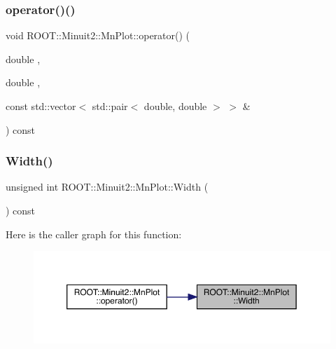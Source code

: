 \subsubsection{\texorpdfstring{operator()()}{operator()()}\hspace{0.1cm}{\footnotesize\ttfamily [4/4]}}
{\footnotesize\ttfamily void R\+O\+O\+T\+::\+Minuit2\+::\+Mn\+Plot\+::operator() (\begin{DoxyParamCaption}\item[{double}]{,  }\item[{double}]{,  }\item[{const std\+::vector$<$ std\+::pair$<$ double, double $>$ $>$ \&}]{ }\end{DoxyParamCaption}) const}

\mbox{\label{classROOT_1_1Minuit2_1_1MnPlot_ae9d97799fcd00d4aa2095884d99dc588}} 
\subsubsection{\texorpdfstring{Width()}{Width()}\hspace{0.1cm}{\footnotesize\ttfamily [1/2]}}
{\footnotesize\ttfamily unsigned int R\+O\+O\+T\+::\+Minuit2\+::\+Mn\+Plot\+::\+Width (\begin{DoxyParamCaption}{ }\end{DoxyParamCaption}) const\hspace{0.3cm}{\ttfamily [inline]}}

Here is the caller graph for this function\+:\nopagebreak
\begin{figure}[H]
\begin{center}
\leavevmode
\includegraphics[width=350pt]{d1/d62/classROOT_1_1Minuit2_1_1MnPlot_ae9d97799fcd00d4aa2095884d99dc588_icgraph}
\end{center}
\end{figure}
\mbox{\label{classROOT_1_1Minuit2_1_1MnPlot_ae9d97799fcd00d4aa2095884d99dc588}} 
